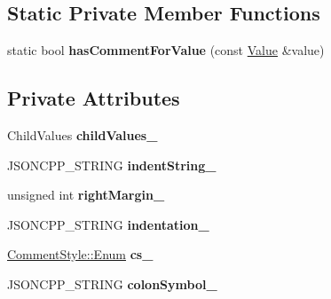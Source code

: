 \subsection*{Static Private Member Functions}
\begin{DoxyCompactItemize}
\item 
\mbox{\label{structJson_1_1BuiltStyledStreamWriter_a457c2f3c1e8c952caeb60e52477d0c9a}} 
static bool {\bfseries has\+Comment\+For\+Value} (const \hyperlink{classJson_1_1Value}{Value} \&value)
\end{DoxyCompactItemize}
\subsection*{Private Attributes}
\begin{DoxyCompactItemize}
\item 
\mbox{\label{structJson_1_1BuiltStyledStreamWriter_a47d562d7874c5b1e68995bd62f575792}} 
Child\+Values {\bfseries child\+Values\+\_\+}
\item 
\mbox{\label{structJson_1_1BuiltStyledStreamWriter_a0f8115a4fb474ab0e9de25f10e5ca09a}} 
J\+S\+O\+N\+C\+P\+P\+\_\+\+S\+T\+R\+I\+NG {\bfseries indent\+String\+\_\+}
\item 
\mbox{\label{structJson_1_1BuiltStyledStreamWriter_a06a51521ccae20397f52fe3036edc602}} 
unsigned int {\bfseries right\+Margin\+\_\+}
\item 
\mbox{\label{structJson_1_1BuiltStyledStreamWriter_aaa4cbad91428ceca37cbabfc2a17a92d}} 
J\+S\+O\+N\+C\+P\+P\+\_\+\+S\+T\+R\+I\+NG {\bfseries indentation\+\_\+}
\item 
\mbox{\label{structJson_1_1BuiltStyledStreamWriter_a89a9c76c7531143b52785861ba21c1d4}} 
\hyperlink{structJson_1_1CommentStyle_a51fc08f3518fd81eba12f340d19a3d0c}{Comment\+Style\+::\+Enum} {\bfseries cs\+\_\+}
\item 
\mbox{\label{structJson_1_1BuiltStyledStreamWriter_a9f10991ddef9b77d0b580e24e71483c6}} 
J\+S\+O\+N\+C\+P\+P\+\_\+\+S\+T\+R\+I\+NG {\bfseries colon\+Symbol\+\_\+}

\end{DoxyCompactItemize}
